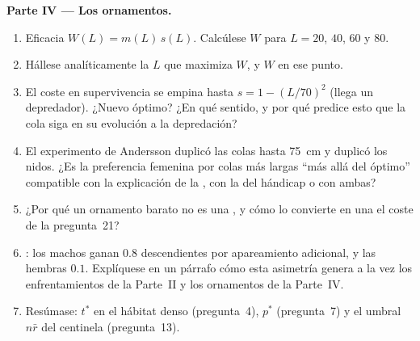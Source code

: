 \begin{problem}
\medskip
\noindent\textbf{Parte IV --- Los ornamentos.}
\begin{enumerate}[resume]
  \item Eficacia $W(L) = m(L)\,s(L)$. Calcúlese $W$ para $L = 20$, $40$,
        $60$ y $80$.
  \item Hállese analíticamente la $L$ que maximiza $W$, y $W$ en ese
        punto.
  \item El coste en supervivencia se empina hasta $s = 1 - (L/70)^{2}$
        (llega un depredador). ¿Nuevo óptimo? ¿En qué sentido, y por qué
        predice esto que la cola siga en su evolución a la depredación?
  \item El experimento de Andersson duplicó las colas hasta
        \qty{75}{cm} y duplicó los nidos. ¿Es la preferencia femenina
        por colas más largas ``más allá del óptimo'' compatible con la
        explicación de la , con la del hándicap o con
        ambas?
  \item ¿Por qué un ornamento barato no es una , y cómo lo
        convierte en una el coste de la pregunta~21?
  \item {}: los machos ganan $0.8$ descendientes por
        apareamiento adicional, y las hembras $0.1$. Explíquese en un
        párrafo cómo esta asimetría genera a la vez los enfrentamientos
        de la Parte~II y los ornamentos de la Parte~IV.
  \item Resúmase: $t^{*}$ en el hábitat denso (pregunta~4), $p^{*}$
        (pregunta~7) y el umbral $n\bar r$ del centinela (pregunta~13).
\end{enumerate}
\end{problem}
